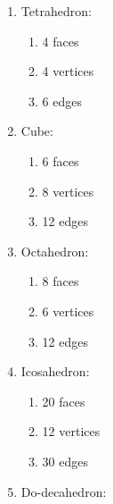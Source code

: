 \documentclass[]{article}
\begin{document}
\begin{enumerate}
  \begin{enumerate}
  \def\labelenumii{\arabic{enumii}.}
  \itemsep1pt\parskip0pt
  \item
    Tetrahedron:

    \begin{enumerate}
    \def\labelenumiii{\arabic{enumiii}.}
    \itemsep1pt\parskip0pt
    \item
      4 faces
    \item
      4 vertices
    \item
      6 edges
    \end{enumerate}
  \item
    Cube:

    \begin{enumerate}
    \def\labelenumiii{\arabic{enumiii}.}
    \itemsep1pt\parskip0pt
    \item
      6 faces
    \item
      8 vertices
    \item
      12 edges
    \end{enumerate}
  \item
    Octahedron:

    \begin{enumerate}
    \def\labelenumiii{\arabic{enumiii}.}
    \itemsep1pt\parskip0pt
    \item
      8 faces
    \item
      6 vertices
    \item
      12 edges
    \end{enumerate}
  \item
    Icosahedron:

    \begin{enumerate}
    \def\labelenumiii{\arabic{enumiii}.}
    \itemsep1pt\parskip0pt
    \item
      20 faces
    \item
      12 vertices
    \item
      30 edges
    \end{enumerate}
  \item
    Do-decahedron:


\end{enumerate}
\end{enumerate}
\end{document}
